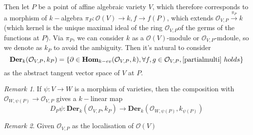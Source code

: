\documentclass[12pt,a4paper,english]{article}
\theoremstyle{plain}
\theoremstyle{definition}
\theoremstyle{remark}
\newtheorem*{rem}{Remark}
\newcommand{\homo}{\mathbf{Hom}}
\newcommand{\der}{\textbf{Der}}
\begin{document}
Then let $P$ be a point of affine algebraic variety $V$, which therefore corresponds to a morphism of $k-$algebra $\pi_{P}:\mathcal{O}(V)\rightarrow k, f\rightarrow f(P)$, which extends $\mathcal{O}_{V,P}\xrightarrow{\pi_{P}} k$(which kernel is the unique maximal ideal of the ring $\mathcal{O}_{V,P}$of the germs of the functions at $P$). Via $\pi_{P}$, we can consider $k$ as a $\mathcal{O}(V)$-module or $\mathcal{O}_{V,P}$-mdoule, so we denote as $k_{P}$ to avoid the ambiguity. Then it's natural to consider
\begin{equation*}
    \der_{k}(\mathcal{O}_{V,P}, k_{P})=\{\partial\in \homo_{k-ev}(\mathcal{O}_{V,P}, k), \forall f,g\in \mathcal{O}_{V, P},\ref{partialmulti}\ holds\}
\end{equation*}
as the abstract tangent vector space of $V$ at $P$.
\begin{rem}
If $\psi: V\rightarrow W$ is a morphism of varieties, then the composition with $\mathcal{O}_{W,\psi(P)}\rightarrow\mathcal{O}_{V,P}$ gives a $k-$linear map 
\begin{equation*}
    D_{P}\psi:\der_{k}(\mathcal{O}_{V,P}, k_{P})\rightarrow \der_{k}(\mathcal{O}_{W,\psi(P)}, k_{\psi(P)})
\end{equation*}
\end{rem}
\begin{rem}
Given $\mathcal{
O}_{V,P}$ as the localisation of $\mathcal{O}(V)$
\end{rem}
\end{document}
